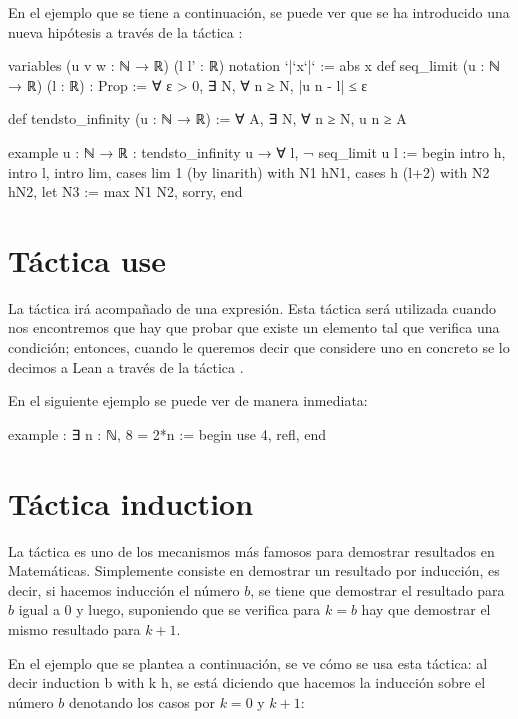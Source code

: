 En el ejemplo que se tiene a continuación, se puede ver que se ha introducido
una nueva hipótesis a través de la táctica :

\begin{leancode}
variables (u v w : ℕ → ℝ) (l l' : ℝ)
notation `|`x`|` := abs x
def seq_limit (u : ℕ → ℝ) (l : ℝ) : Prop :=
∀ ε > 0, ∃ N, ∀ n ≥ N, |u n - l| ≤ ε

def tendsto_infinity (u : ℕ → ℝ) := ∀ A, ∃ N, ∀ n ≥ N, u n ≥ A

example {u : ℕ → ℝ} : tendsto_infinity u → ∀ l, ¬ seq_limit u l :=
begin
  intro h,
  intro l,
  intro lim,
  cases lim 1 (by linarith) with N1 hN1,
  cases h (l+2) with N2 hN2,
  let N3 := max N1 N2,
  sorry,
end
\end{leancode}

\section{Táctica use}

La táctica  irá acompañado de una expresión. Esta
táctica será utilizada cuando nos encontremos que hay que probar que
existe un elemento tal que verifica una condición; entonces, cuando le
queremos decir que considere uno en concreto se lo decimos a Lean
a través de la táctica .

En el siguiente ejemplo se puede ver de manera inmediata:

\begin{leancode}
example : ∃ n : ℕ, 8 = 2*n :=
begin
  use 4,
  refl,
end
\end{leancode}

\section{Táctica induction}

La táctica  es uno de los mecanismos más famosos
para demostrar resultados en Matemáticas. Simplemente consiste en demostrar
un resultado por inducción, es decir, si hacemos inducción el número \(b\),
se tiene que demostrar el resultado para \(b\) igual a \(0\) y luego, suponiendo
que se verifica para \(k=b\) hay que demostrar el mismo resultado para \(k+1\).

En el ejemplo que se plantea a continuación, se ve cómo se usa esta táctica:
al decir induction b with k h, se está diciendo que hacemos la inducción sobre
el número \(b\) denotando los casos por \(k=0\) y \(k+1\):

